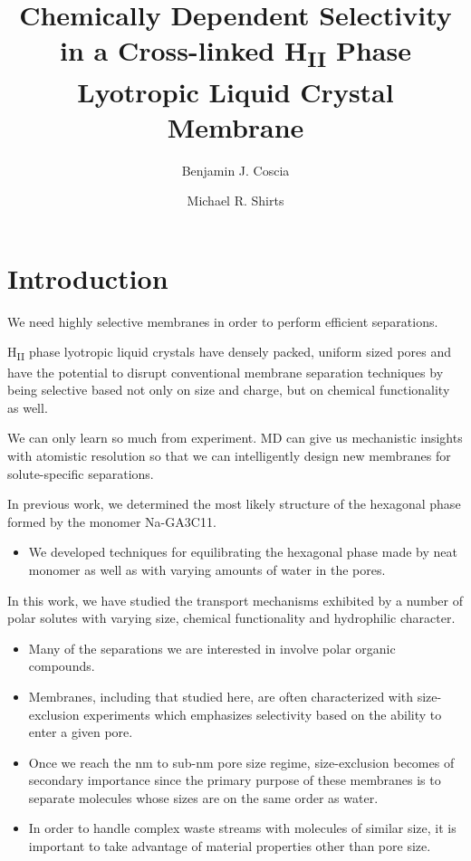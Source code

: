 \documentclass{article}
\title{Chemically Dependent Selectivity in a Cross-linked H\textsubscript{II} Phase Lyotropic Liquid Crystal Membrane}
\author{Benjamin J. Coscia \and Michael R. Shirts}
\begin{document}
  \graphicspath{{./figures/}}
  \maketitle

  \section{Introduction}

  We need highly selective membranes in order to perform efficient separations.

  H\textsubscript{II} phase lyotropic liquid crystals have densely packed, uniform
  sized pores and have the potential to disrupt conventional membrane separation
  techniques by being selective based not only on size and charge, but on chemical
  functionality as well.

  We can only learn so much from experiment. MD can give us mechanistic insights with
  atomistic resolution so that we can intelligently design new membranes for 
  solute-specific separations.

  In previous work, we determined the most likely structure of the hexagonal phase 
  formed by the monomer Na-GA3C11.
  \begin{itemize}
  	\item We developed techniques for equilibrating the hexagonal phase made by
	neat monomer as well as with varying amounts of water in the pores.
  \end{itemize} 

  In this work, we have studied the transport mechanisms exhibited by a number
  of polar solutes with varying size, chemical functionality and hydrophilic character.
  \begin{itemize}
	\item Many of the separations we are interested in involve polar organic 
	compounds.
  \end{itemize} 

  \begin{itemize}  
  	\item Membranes, including that studied here, are often characterized 
  	with size-exclusion experiments which emphasizes selectivity based on the ability
  	to enter a given pore. 
  	\item Once we reach the nm to sub-nm pore size regime, size-exclusion 
  	becomes of secondary importance since the primary purpose of these membranes is to 
  	separate molecules whose sizes are on the same order as water.
  	\item In order to handle complex waste streams with molecules of similar size,
  	it is important to take advantage of material properties other than pore size. 
  \end{itemize}
  
\end{document}
